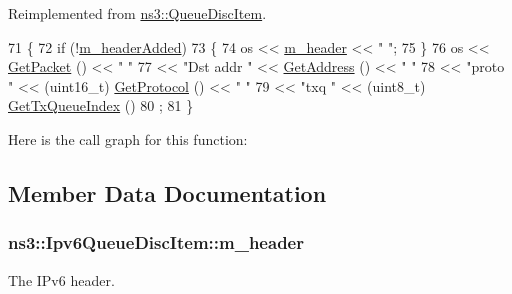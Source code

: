 Reimplemented from \hyperlink{classns3_1_1QueueDiscItem_ade009bbe42f262c76d68a8530e207762}{ns3\+::\+Queue\+Disc\+Item}.


\begin{DoxyCode}
71 \{
72   \textcolor{keywordflow}{if} (!\hyperlink{classns3_1_1Ipv6QueueDiscItem_af8aab7d08fadc62cf1f251909a6422ce}{m\_headerAdded})
73     \{
74       os << \hyperlink{classns3_1_1Ipv6QueueDiscItem_a6a7616c84b6f71b31f1933a05d28c833}{m\_header} << \textcolor{stringliteral}{" "};
75     \}
76   os << \hyperlink{classns3_1_1QueueItem_aa8c2a59b1600fa2cee783867704f9cce}{GetPacket} () << \textcolor{stringliteral}{" "}
77      << \textcolor{stringliteral}{"Dst addr "} << \hyperlink{classns3_1_1QueueDiscItem_ac13b6adb92790c4e850698a3a11fd448}{GetAddress} () << \textcolor{stringliteral}{" "}
78      << \textcolor{stringliteral}{"proto "} << (uint16\_t) \hyperlink{classns3_1_1QueueDiscItem_aa1538ff5222ab86652d21d005ad839a4}{GetProtocol} () << \textcolor{stringliteral}{" "}
79      << \textcolor{stringliteral}{"txq "} << (uint8\_t) \hyperlink{classns3_1_1QueueDiscItem_ac0f4a13528a69cb352cb7549fe3eb574}{GetTxQueueIndex} ()
80   ;
81 \}
\end{DoxyCode}


Here is the call graph for this function\+:




\subsection{Member Data Documentation}
\subsubsection[{\texorpdfstring{m\+\_\+header}{m_header}}]{ ns3\+::\+Ipv6\+Queue\+Disc\+Item\+::m\+\_\+header\hspace{0.3cm}{\ttfamily [private]}}\hypertarget{classns3_1_1Ipv6QueueDiscItem_a6a7616c84b6f71b31f1933a05d28c833}{}\label{classns3_1_1Ipv6QueueDiscItem_a6a7616c84b6f71b31f1933a05d28c833}


The I\+Pv6 header. 

